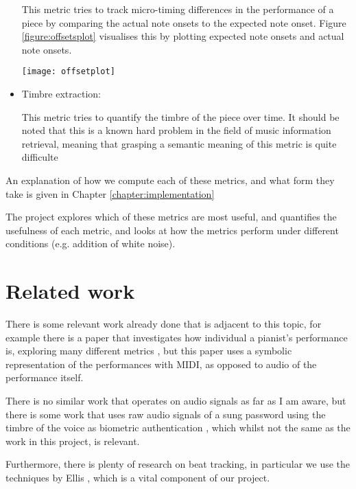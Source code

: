 \documentclass[oneside, class=book, crop=false, 12pt]{standalone}
\begin{document}
\begin{itemize}
    This metric tries to track micro-timing differences in the performance of a piece by comparing the actual note onsets to the expected note onset. Figure \ref{figure:offsetsplot} visualises this by plotting expected note onsets and actual note onsets.

\begin{minipage}{\textwidth}
  \centering
  \texttt{[image: offsetplot]}
  \label{figure:offsetsplot}
\end{minipage}



  \item
    Timbre extraction:

    This metric tries to quantify the timbre of the piece over time. It should be noted that this is a known hard problem in the field of music information retrieval, meaning that grasping a semantic meaning of this metric is quite difficulte
\end{itemize}





An explanation of how we compute each of these metrics, and what form they take is given in Chapter \ref{chapter:implementation}

The project explores which of these metrics are most useful, and quantifies the usefulness of each metric, and looks at how the metrics perform under different conditions (e.g. addition of white noise).


\section{Related work}

There is some relevant work already done that is adjacent to this topic, for example there is a paper that investigates how individual a pianist's performance is, exploring many different metrics \cite{bernays14}, but this paper uses a symbolic representation of the performances with MIDI, as opposed to audio of the performance itself.

There is no similar work that operates on audio signals as far as I am aware, but there is some work that uses raw audio signals of a sung password using the timbre of the voice as biometric authentication \cite{prakash16}, which whilst not the same as the work in this project, is relevant.

Furthermore, there is plenty of research on beat tracking, in particular we use the techniques by Ellis \cite{ellis07}, which is a vital component of our project.


\ifstandalone
  \printbibliography[heading=subbibliography]
\fi
    
\end{document}
